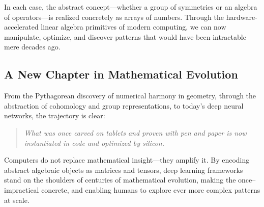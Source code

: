 In each case, the abstract concept—whether a group of symmetries or an algebra of operators—is realized concretely as arrays of numbers.  Through the hardware‐accelerated linear algebra primitives of modern computing, we can now manipulate, optimize, and discover patterns that would have been intractable mere decades ago.





\subsection{A New Chapter in Mathematical Evolution}
From the Pythagorean discovery of numerical harmony in geometry, through the abstraction of cohomology and group representations, to today’s deep neural networks, the trajectory is clear:

\begin{quote}
\textit{What was once carved on tablets and proven with pen and paper is now instantiated in code and optimized by silicon.}
\end{quote}

Computers do not replace mathematical insight—they amplify it.  By encoding abstract algebraic objects as matrices and tensors, deep learning frameworks stand on the shoulders of centuries of mathematical evolution, making the once–impractical concrete, and enabling humans to explore ever more complex patterns at scale.

